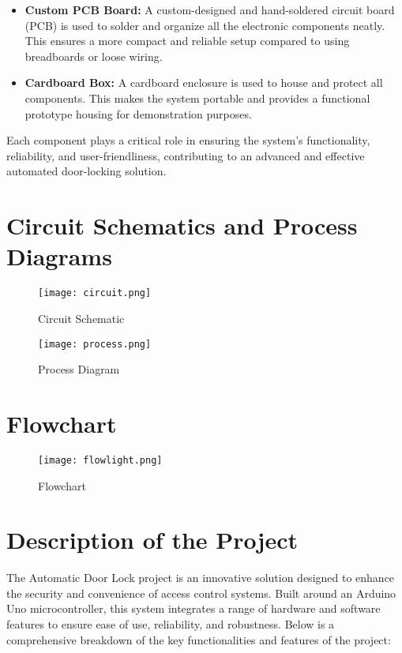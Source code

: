 \documentclass[a4paper, 12pt]{article}
\begin{document}
\begin{itemize}
    \item \textbf{Custom PCB Board:} 
    A custom-designed and hand-soldered circuit board (PCB) is used to solder and organize all the electronic components neatly. This ensures a more compact and reliable setup compared to using breadboards or loose wiring.

    \item \textbf{Cardboard Box:} 
    A cardboard enclosure is used to house and protect all components. This makes the system portable and provides a functional prototype housing for demonstration purposes.

\end{itemize}

Each component plays a critical role in ensuring the system's functionality, reliability, and user-friendliness, contributing to an advanced and effective automated door-locking solution.


\section{Circuit Schematics and Process Diagrams}
\begin{figure}[H]
    \centering
    \texttt{[image: circuit.png]}
    \caption{Circuit Schematic}
\end{figure}

\begin{figure}[H]
    \centering
    \texttt{[image: process.png]}
    \caption{Process Diagram}
\end{figure}

\section{Flowchart}
\begin{figure}[H]
    \centering
    \texttt{[image: flowlight.png]} 
    \caption{Flowchart}
\end{figure}

\section*{Description of the Project}

The Automatic Door Lock project is an innovative solution designed to enhance the security and convenience of access control systems. Built around an Arduino Uno microcontroller, this system integrates a range of hardware and software features to ensure ease of use, reliability, and robustness. Below is a comprehensive breakdown of the key functionalities and features of the project:
\end{document}
